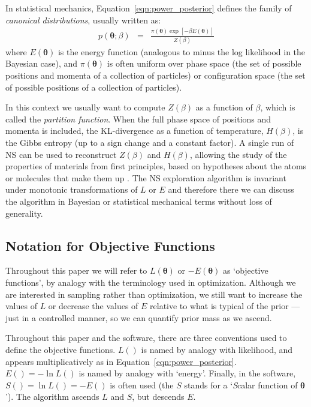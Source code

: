 \documentclass[entropy,article,submit,moreauthors,pdftex,10pt,a4paper]{Definitions/mdpi}
\newcommand{\xx}{\boldsymbol{\theta}}
\begin{document}
In statistical mechanics, Equation~\ref{eqn:power_posterior} defines the
family of {\it canonical distributions}, usually written as:
\begin{eqnarray}
p(\xx; \beta) &=& \frac{\pi(\xx)\exp[-\beta E(\xx)]}{Z(\beta)}
\end{eqnarray}
where $E(\xx)$ is the energy function (analogous to minus the log likelihood
in the Bayesian case), and $\pi(\xx)$ is often uniform over
phase space (the set of possible positions and momenta of a collection of
particles) or configuration space (the set of possible positions of a collection
of particles).

In this context we usually want to
compute $Z(\beta)$ as a function of $\beta$, which is called the
{\it partition function}. When the full phase space of positions and momenta
is included, the KL-divergence as a function of temperature,
$H(\beta)$, is the Gibbs entropy (up to a sign change and a constant factor).
A single run of NS can be used to reconstruct $Z(\beta)$ and $H(\beta)$,
allowing the study of
the properties of materials from first principles, based on hypotheses about
the atoms or molecules that make them up
\citep[e.g.][]{partay2010efficient, baldock2016determining}.
The NS exploration algorithm is invariant under
monotonic transformations of $L$ or $E$ and therefore there we can discuss the
algorithm in Bayesian or statistical mechanical terms without loss of
generality.

\subsection{Notation for Objective Functions}
Throughout this paper we will refer to $L(\xx)$ or
$-E(\xx)$ as `objective functions',
by analogy with the terminology used in optimization.
Although we are interested in sampling rather
than optimization, we still want to increase the values of $L$ or decrease
the values of $E$ relative to what is typical of the prior --- just in
a controlled manner, so we can quantify prior mass as we ascend.

Throughout this paper and the software, there are three
conventions used to define the objective functions. $L()$ is named by analogy
with likelihood, and appears multiplicatively as in
Equation~\ref{eqn:power_posterior}. $E() = -\ln L()$ is named by analogy with
`energy'. Finally, in the software,
$S() = \ln L() = -E()$ is often used (the $S$ stands for a
`{\em S}calar function of $\xx$'). The algorithm ascends $L$ and $S$, but
descends $E$.
\end{document}
